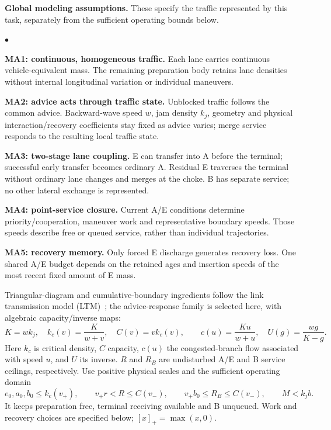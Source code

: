 \documentclass[10pt,a4paper]{article}
\newenvironment{points}{\begin{list}{$\bullet$}{%
 \setlength{\leftmargin}{1.4em}\setlength{\labelwidth}{0.7em}%
 \setlength{\labelsep}{0.4em}\setlength{\itemsep}{2pt}%
 \setlength{\parsep}{0pt}\setlength{\topsep}{3pt}}}{\end{list}}
\begin{document}
\textbf{Global modeling assumptions.} These specify the traffic represented
by this task, separately from the sufficient operating bounds below.
\begin{points}
\item \textbf{MA1: continuous, homogeneous traffic.} Each lane carries
continuous vehicle-equivalent mass. The remaining preparation body retains
lane densities without internal longitudinal variation or individual maneuvers.
\item \textbf{MA2: advice acts through traffic state.} Unblocked traffic
follows the common advice. Backward-wave speed $w$, jam density $k_j$,
geometry and physical interaction/recovery coefficients stay fixed as advice
varies; merge service responds to the resulting local traffic state.
\item \textbf{MA3: two-stage lane coupling.} E can transfer into A before
the terminal; successful early transfer becomes ordinary A. Residual E
traverses the terminal without ordinary lane changes and merges at the choke.
B has separate service; no other lateral exchange is represented.
\item \textbf{MA4: point-service closure.} Current A/E conditions determine
priority/cooperation, maneuver work and representative boundary speeds.
Those speeds describe free or queued service, rather than individual trajectories.
\item \textbf{MA5: recovery memory.} Only forced E discharge generates
recovery loss. One shared A/E budget depends on the retained ages and
insertion speeds of the most recent fixed amount of E mass.
\end{points}

Triangular-diagram and cumulative-boundary ingredients follow the link
transmission model (LTM)~\cite{jin}; the advice-response family is selected
here, with algebraic capacity/inverse maps:
\begin{equation}
 K=wk_j,\quad k_c(v)=\frac{K}{w+v},\quad C(v)=vk_c(v),\qquad
 c(u)=\frac{Ku}{w+u},\quad U(g)=\frac{wg}{K-g}.
 \label{eq:fd}
\end{equation}
Here $k_c$ is critical density, $C$ capacity, $c(u)$ the
congested-branch flow associated with speed $u$, and $U$ its inverse.
$R$ and $R_B$ are undisturbed A/E and B service ceilings, respectively.
Use positive physical scales and the sufficient operating domain
\begin{equation}
 e_0,a_0,b_0\leq k_c(v_+),\qquad
 v_+r<R\leq C(v_-),\qquad v_+b_0\leq R_B\leq C(v_-),\qquad M<k_jb.
 \label{eq:domain}
\end{equation}
It keeps preparation free, terminal receiving available and B unqueued.
Work and recovery choices are specified below; $[x]_+=\max(x,0)$.
\end{document}
